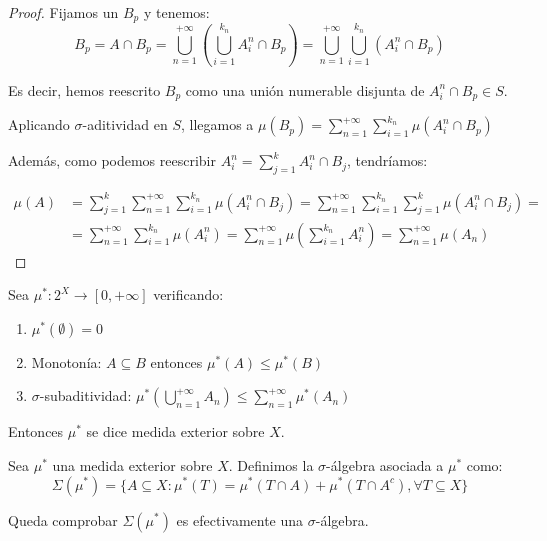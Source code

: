 \begin{proof}
 Fijamos un $B_p$ y tenemos:
 \[B_p = A \cap B_p = \bigcup_{n=1}^{+\infty} \left(\bigcup_{i=1}^{k_n} A_i^n \cap B_p\right) = 
         \bigcup_{n=1}^{+\infty} \bigcup_{i=1}^{k_n} \left(A_i^n \cap B_p\right)\]
 
 Es decir, hemos reescrito $B_p$ como una unión numerable disjunta de $A_i^n \cap B_p \in S$.
 
 Aplicando $\sigma$-aditividad en $S$, llegamos a $\mu(B_p) = \sum_{n=1}^{+\infty} \sum_{i=1}^{k_n} \mu(A_i^n \cap B_p)$
 
 Además, como podemos reescribir $A_i^{n} = \sum_{j=1}^k A_i^{n} \cap B_j$, tendríamos:
 
 \begin{align*}
 \mu(A) &= \sum_{j=1}^k \sum_{n=1}^{+\infty} \sum_{i=1}^{k_n} \mu(A_i^n \cap B_j) = 
           \sum_{n=1}^{+\infty} \sum_{i=1}^{k_n} \sum_{j=1}^k \mu(A_i^n \cap B_j) = \\
        &= \sum_{n=1}^{+\infty} \sum_{i=1}^{k_n} \mu(A_i^n) =
           \sum_{n=1}^{+\infty} \mu \left(\sum_{i=1}^{k_n} A_i^n \right) =
           \sum_{n=1}^{+\infty} \mu(A_n)
 \end{align*}
\end{proof}

\begin{definition}
 Sea $\mu^\ast : 2^X \rightarrow [0, +\infty]$ verificando:
 
 \begin{enumerate}[i]
  \item $\mu^\ast(\emptyset) = 0$
  \item Monotonía: $A\subseteq B$ entonces $\mu^\ast(A) \le \mu^\ast(B)$
  \item $\sigma$-subaditividad: $\mu^\ast \left(\bigcup_{n=1}^{+\infty} A_n \right) \le \sum_{n=1}^{+\infty} \mu^\ast (A_n)$
 \end{enumerate}
 
 Entonces $\mu^\ast$ se dice medida exterior sobre $X$.
\end{definition}

\begin{definition}
 Sea $\mu^\ast$ una medida exterior sobre $X$. Definimos la $\sigma$-álgebra asociada a $\mu^\ast$ como:
 \[\Sigma(\mu^\ast) = \{A\subseteq X: \mu^\ast(T) = \mu^\ast(T\cap A) + \mu^\ast(T\cap A^c), \forall T\subseteq X\}\]
\end{definition}

Queda comprobar $\Sigma(\mu^\ast)$ es efectivamente una $\sigma$-álgebra.

